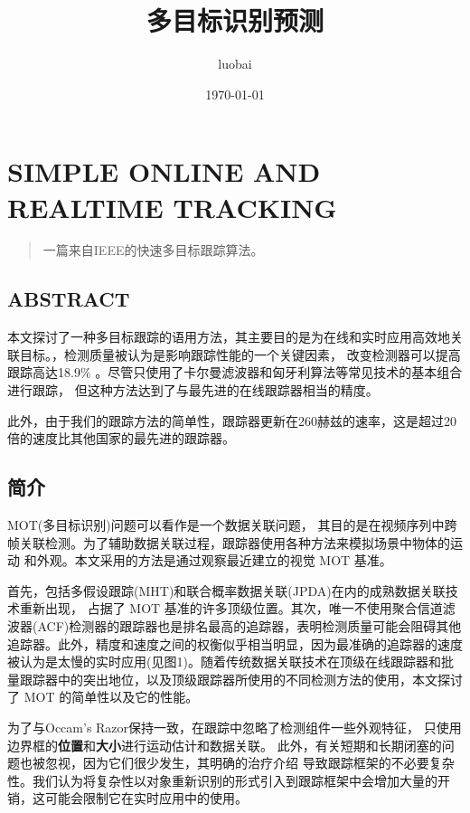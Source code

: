 \documentclass{article}
\title{多目标识别预测}
\author{luobai}
\date{\today}
\begin{document}
\maketitle
\newpage

\renewcommand{\baselinestretch}{1.35}
\tableofcontents
\newpage

\setlength{\parskip}{0em}
\renewcommand{\baselinestretch}{1.53}


\section{SIMPLE ONLINE AND REALTIME TRACKING}
\begin{quote}
{\qquad{}\ccwd\kaishu{}
一篇来自IEEE的快速多目标跟踪算法。
}
\end{quote}

\subsection{ABSTRACT}
本文探讨了一种多目标跟踪的语用方法，其主要目的是为在线和实时应用高效地关联目标。，检测质量被认为是影响跟踪性能的一个关键因素，
改变检测器可以提高跟踪高达18.9\% 。尽管只使用了卡尔曼滤波器和匈牙利算法等常见技术的基本组合进行跟踪，
但这种方法达到了与最先进的在线跟踪器相当的精度。

此外，由于我们的跟踪方法的简单性，跟踪器更新在260赫兹的速率，这是超过20倍的速度比其他国家的最先进的跟踪器。

\subsection{简介}
MOT(多目标识别)问题可以看作是一个数据关联问题，
其目的是在视频序列中跨帧关联检测。为了辅助数据关联过程，跟踪器使用各种方法来模拟场景中物体的运动
和外观。本文采用的方法是通过观察最近建立的视觉 MOT 基准。

首先，包括多假设跟踪(MHT)和联合概率数据关联(JPDA)在内的成熟数据关联技术重新出现，
占据了 MOT 基准的许多顶级位置。其次，唯一不使用聚合信道滤波器(ACF)检测器的跟踪器也是排名最高的追踪器，表明检测质量可能会阻碍其他追踪器。此外，精度和速度之间的权衡似乎相当明显，因为最准确的追踪器的速度被认为是太慢的实时应用(见图1)。随着传统数据关联技术在顶级在线跟踪器和批量跟踪器中的突出地位，以及顶级跟踪器所使用的不同检测方法的使用，本文探讨了 MOT 的简单性以及它的性能。

为了与Occam’s Razor保持一致，在跟踪中忽略了检测组件一些外观特征，
只使用边界框的\textbf{位置}和\textbf{大小}进行运动估计和数据关联。
此外，有关短期和长期闭塞的问题也被忽视，因为它们很少发生，其明确的治疗介绍
导致跟踪框架的不必要复杂性。我们认为将复杂性以对象重新识别的形式引入到跟踪框架中会增加大量的开销，这可能会限制它在实时应用中的使用。
\end{document}
